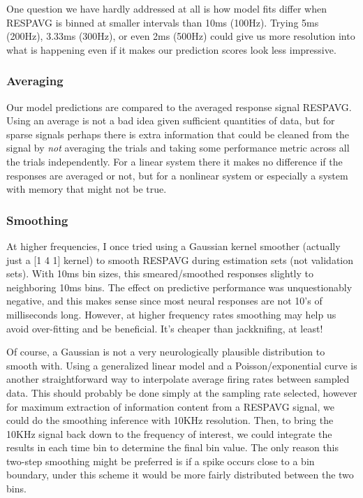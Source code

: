 \documentclass[11pt]{article}
\begin{document}
    One question we have hardly addressed at all is how model fits differ when RESPAVG is binned at smaller intervals than 10ms (100Hz). Trying 5ms (200Hz), 3.33ms (300Hz), or even 2ms (500Hz) could give us more resolution into what is happening even if it makes our prediction scores look less impressive.

\subsubsection{Averaging}
\label{sec-2.2.2}


    Our model predictions are compared to the averaged response signal RESPAVG. Using an average is not a bad idea given sufficient quantities of data, but for sparse signals perhaps there is extra information that could be cleaned from the signal by \emph{not} averaging the trials and taking some performance metric across all the trials independently. For a linear system there it makes no difference if the responses are averaged or not, but for a nonlinear system or especially a system with memory that might not be true. 

\subsubsection{Smoothing}
\label{sec-2.2.3}


    At higher frequencies, I once tried using a Gaussian kernel smoother (actually just a [1 4 1] kernel) to smooth RESPAVG during estimation sets (not validation sets). With 10ms bin sizes, this smeared/smoothed responses slightly to neighboring 10ms bins. The effect on predictive performance was unquestionably negative, and this makes sense since most neural responses are not 10's of milliseconds long. However, at higher frequency rates smoothing may help us avoid over-fitting and be beneficial. It's cheaper than jackknifing, at least!
    
    Of course, a Gaussian is not a very neurologically plausible distribution to smooth with. Using a generalized linear model and a Poisson/exponential curve is another straightforward way to interpolate average firing rates between sampled data. This should probably be done simply at the sampling rate selected, however for maximum extraction of information content from a RESPAVG signal, we could do the smoothing inference with 10KHz resolution. Then, to bring the 10KHz signal back down to the frequency of interest, we could integrate the results in each time bin to determine the final bin value. The only reason this two-step smoothing might be preferred is if a spike occurs close to a bin boundary, under this scheme it would be more fairly distributed between the two bins.
\end{document}
